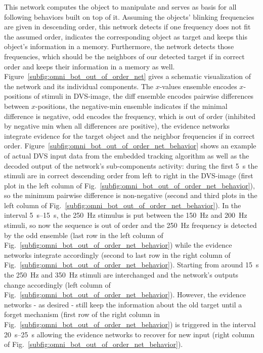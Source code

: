 This network computes the object to manipulate and serves as basis for all following behaviors built on top of it. 
Assuming the objects' blinking frequencies are given in descending order, this network detects if one frequency does not fit the assumed order, indicates the corresponding object as target and keeps this object's information in a memory. 
Furthermore, the network detects those frequencies, which should be the neighbors of our detected target if in correct order and keeps their information in a memory as well.
Figure~\ref{subfig:omni_bot_out_of_order_net} gives a schematic visualization of the network and its individual components.
The $x$-values ensemble encodes $x$-positions of stimuli in \ac{DVS}-image, the diff ensemble encodes pairwise differences between $x$-positions, the negative-min ensemble indicates if the minimal difference is negative, odd encodes the frequency, which is out of order (inhibited by negative min when all differences are positive), the evidence networks integrate evidence for the target object and the neighbor frequencies if in correct order.
Figure~\ref{subfig:omni_bot_out_of_order_net_behavior} shows an example of actual \ac{DVS} input data from the embedded tracking algorithm as well as the decoded output of the network’s sub-components activity: during the first \SI{5}{\second} the stimuli are in correct descending order from left to right in the \ac{DVS}-image (first plot in the left column of Fig.~\ref{subfig:omni_bot_out_of_order_net_behavior}), so the minimum pairwise difference is non-negative (second and third
plots in the left column of Fig.~\ref{subfig:omni_bot_out_of_order_net_behavior}). 
In the interval \SIrange{5}{15}{\second}, the \SI{250}{\hertz} stimulus is put between the \SI{150}{\hertz} and \SI{200}{\hertz} stimuli, so now the sequence is out of order and the \SI{250}{\hertz} frequency is detected by the odd ensemble (last row in the left column of Fig.~\ref{subfig:omni_bot_out_of_order_net_behavior}) while the evidence networks integrate accordingly (second to last row in the right column of Fig.~\ref{subfig:omni_bot_out_of_order_net_behavior}). 
Starting from around \SI{15}{\second} the \SI{250}{\hertz} and \SI{350}{\hertz} stimuli are interchanged and the network's outputs change accordingly (left column of Fig.~\ref{subfig:omni_bot_out_of_order_net_behavior}).
However, the evidence networks - as desired - still keep the information about the old target until a forget mechanism (first row of the right column in Fig.~\ref{subfig:omni_bot_out_of_order_net_behavior}) is triggered in the interval \SIrange{20}{25}{\second} allowing the evidence networks to recover for new input (right column of Fig.~\ref{subfig:omni_bot_out_of_order_net_behavior}).

